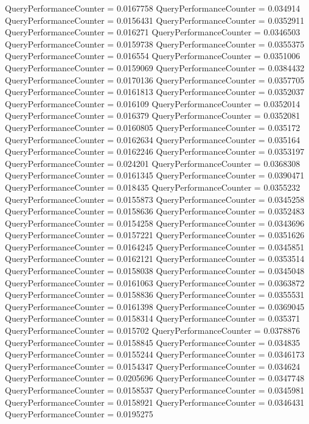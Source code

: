 \documentclass[9pt]{article}
\theoremstyle{plain}
\theoremstyle{definition}
\theoremstyle{remark}
\numberwithin{equation}{section}
\begin{document}
QueryPerformanceCounter  =  0.0167758
QueryPerformanceCounter  =  0.034914
QueryPerformanceCounter  =  0.0156431
QueryPerformanceCounter  =  0.0352911
QueryPerformanceCounter  =  0.016271
QueryPerformanceCounter  =  0.0346503
QueryPerformanceCounter  =  0.0159738
QueryPerformanceCounter  =  0.0355375
QueryPerformanceCounter  =  0.016554
QueryPerformanceCounter  =  0.0351006
QueryPerformanceCounter  =  0.0159069
QueryPerformanceCounter  =  0.0384432
QueryPerformanceCounter  =  0.0170136
QueryPerformanceCounter  =  0.0357705
QueryPerformanceCounter  =  0.0161813
QueryPerformanceCounter  =  0.0352037
QueryPerformanceCounter  =  0.016109
QueryPerformanceCounter  =  0.0352014
QueryPerformanceCounter  =  0.016379
QueryPerformanceCounter  =  0.0352081
QueryPerformanceCounter  =  0.0160805
QueryPerformanceCounter  =  0.035172
QueryPerformanceCounter  =  0.0162634
QueryPerformanceCounter  =  0.035164
QueryPerformanceCounter  =  0.0162246
QueryPerformanceCounter  =  0.0353197
QueryPerformanceCounter  =  0.024201
QueryPerformanceCounter  =  0.0368308
QueryPerformanceCounter  =  0.0161345
QueryPerformanceCounter  =  0.0390471
QueryPerformanceCounter  =  0.018435
QueryPerformanceCounter  =  0.0355232
QueryPerformanceCounter  =  0.0155873
QueryPerformanceCounter  =  0.0345258
QueryPerformanceCounter  =  0.0158636
QueryPerformanceCounter  =  0.0352483
QueryPerformanceCounter  =  0.0154258
QueryPerformanceCounter  =  0.0343696
QueryPerformanceCounter  =  0.0157221
QueryPerformanceCounter  =  0.0351626
QueryPerformanceCounter  =  0.0164245
QueryPerformanceCounter  =  0.0345851
QueryPerformanceCounter  =  0.0162121
QueryPerformanceCounter  =  0.0353514
QueryPerformanceCounter  =  0.0158038
QueryPerformanceCounter  =  0.0345048
QueryPerformanceCounter  =  0.0161063
QueryPerformanceCounter  =  0.0363872
QueryPerformanceCounter  =  0.0158836
QueryPerformanceCounter  =  0.0355531
QueryPerformanceCounter  =  0.0161398
QueryPerformanceCounter  =  0.0369045
QueryPerformanceCounter  =  0.0158314
QueryPerformanceCounter  =  0.035371
QueryPerformanceCounter  =  0.015702
QueryPerformanceCounter  =  0.0378876
QueryPerformanceCounter  =  0.0158845
QueryPerformanceCounter  =  0.034835
QueryPerformanceCounter  =  0.0155244
QueryPerformanceCounter  =  0.0346173
QueryPerformanceCounter  =  0.0154347
QueryPerformanceCounter  =  0.034624
QueryPerformanceCounter  =  0.0205696
QueryPerformanceCounter  =  0.0347748
QueryPerformanceCounter  =  0.0158537
QueryPerformanceCounter  =  0.0345981
QueryPerformanceCounter  =  0.0158921
QueryPerformanceCounter  =  0.0346431
QueryPerformanceCounter  =  0.0195275
\end{document}
